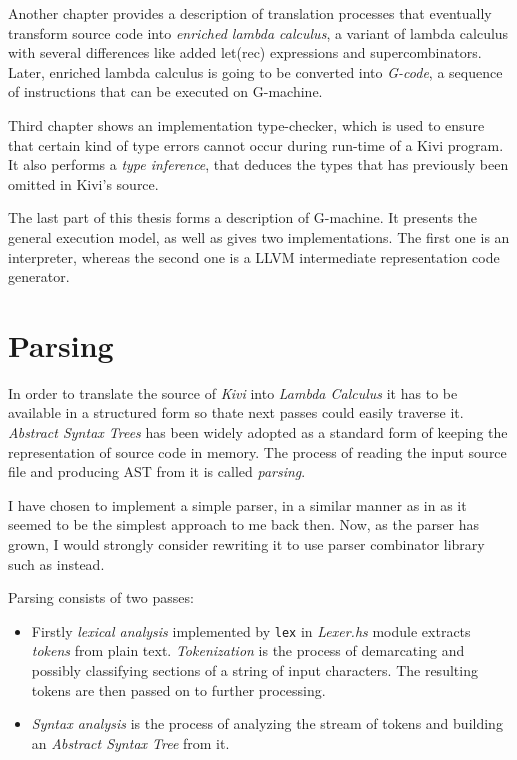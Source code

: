 \documentclass[12pt,a4paper]{report}
\begin{document}
Another chapter provides a description of translation processes that eventually
transform source code into \textit{enriched lambda calculus}, a variant of
lambda calculus with several differences like added let(rec) expressions and
supercombinators. Later, enriched lambda calculus is going to be converted
into \textit{G-code}, a sequence of instructions that can be executed on
G-machine.

Third chapter shows an implementation type-checker, which is used to ensure
that certain kind of type errors cannot occur during run-time of a Kivi
program. It also performs a \textit{type inference}, that deduces the types
that has previously been omitted in Kivi's source.

The last part of this thesis forms a description of G-machine. It presents the
general execution model, as well as gives two implementations. The first one is
an interpreter, whereas the second one is a LLVM intermediate representation
code generator.

\chapter{Parsing}

In order to translate the source of \textit{Kivi} into \textit{Lambda Calculus}
it has to be available in a structured form so thate next passes could easily
traverse it. \textit{Abstract Syntax Trees}\cite{ALSU07} has been widely
adopted as a standard form of keeping the representation of source code in
memory. The process of reading the input source file and producing AST from it
is called \textit{parsing}.

I have chosen to implement a simple parser, in a similar manner as in
\cite{JonLes00} as it seemed to be the simplest approach to me back then. Now, as
the parser has grown, I would strongly consider rewriting it to use parser
combinator library such as \cite{website:parsec} instead.

Parsing consists of two passes:

\begin{itemize}
  \item Firstly \textit{lexical analysis} implemented by \texttt{lex} in
    \textit{Lexer.hs} module extracts \textit{tokens} from plain text.
    \textit{Tokenization} is the process of demarcating and possibly
    classifying sections of a string of input characters. The resulting tokens
    are then passed on to further processing.
  \item \textit{Syntax analysis} is the process of analyzing the stream of
    tokens and building an \textit{Abstract Syntax Tree} from it.
\end{itemize}
\end{document}
